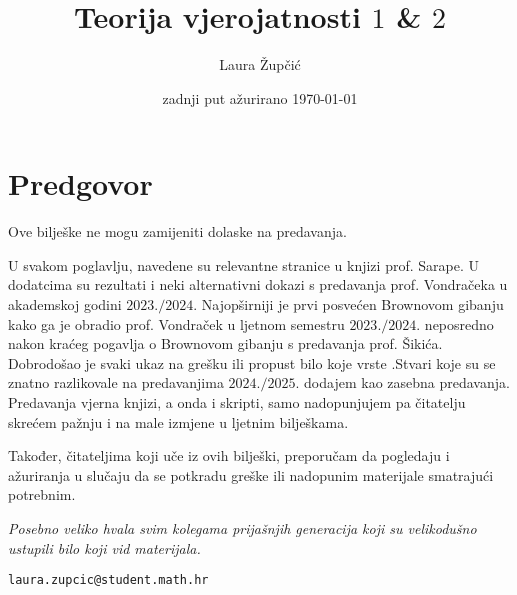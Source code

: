 \documentclass{article}
\title{Teorija vjerojatnosti \(1\) \& \(2\)}
\date{zadnji put ažurirano \today }
\author{Laura Župčić}
\begin{document}
\begin{titlepage}
\end{titlepage}
\clearpage
\section*{Predgovor}
\textcolor{WildStrawberry}{Ove bilješke ne mogu zamijeniti dolaske na predavanja.}\newline\newline

U svakom poglavlju, navedene su relevantne stranice u knjizi prof. Sarape. U dodatcima su rezultati i neki alternativni dokazi s predavanja prof. Vondračeka u akademskoj godini \(2023./2024.\) Najopširniji je prvi posvećen Brownovom gibanju kako ga je obradio prof. Vondraček u ljetnom semestru \(2023./2024.\) neposredno nakon kraćeg pogavlja o Brownovom gibanju s predavanja prof. Šikića.  \newline\newline \textcolor{WildStrawberry}{Dobrodošao je svaki ukaz na grešku ili propust bilo koje vrste \smiley\smiley\smiley.}\newline\newline Stvari koje su se znatno razlikovale na predavanjima \(2024./2025.\) dodajem kao zasebna predavanja. Predavanja vjerna knjizi, a onda i skripti, samo nadopunjujem pa čitatelju skrećem pažnju i na male izmjene u ljetnim bilješkama.\newline\newline

Također, čitateljima koji uče iz ovih bilješki, preporučam da pogledaju i ažuriranja u slučaju da se potkradu greške ili nadopunim materijale smatrajući potrebnim.\newline
\begin{center}
    \large{\textit{Posebno veliko hvala svim kolegama prijašnjih generacija koji su velikodušno ustupili bilo koji vid materijala.}}
\end{center}
\vspace{2em}
\begin{flushright}
    \texttt{laura.zupcic@student.math.hr}
\end{flushright}
\end{document}
